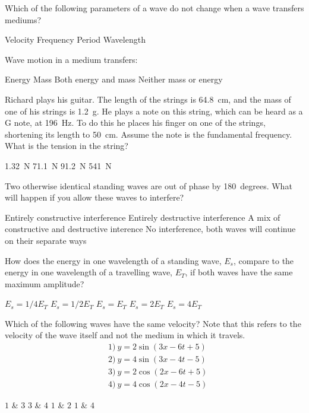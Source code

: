 \question Which of the following parameters of a wave do not change when a wave transfers mediums?
\begin{checkboxes}
\choice Velocity
\CorrectChoice Frequency \correct
\CorrectChoice Period \correct
\choice Wavelength
\end{checkboxes}

\question Wave motion in a medium transfers:
\begin{checkboxes}
\CorrectChoice Energy \correct
\choice Mass
\choice Both energy and mass
\choice Neither mass or energy
\end{checkboxes}


\question Richard plays his guitar.  The length of the strings is \SI{64.8}{cm}, and the mass of one of his strings is \SI{1.2}{g}.  He plays a note on this string, which can be heard as a G note, at \SI{196}{Hz}.  To do this he places his finger on one of the strings, shortening its length to \SI{50}{cm}.  Assume the note is the fundamental frequency. What is the tension in the string?
\begin{checkboxes}
\choice \SI{1.32}{N}
\CorrectChoice \SI{71.1}{N} \correct
\choice  \SI{91.2}{N}
\choice \SI{541}{N}
\end{checkboxes}


\question Two otherwise identical standing waves are out of phase by \SI{180}{degrees}. What will happen if you allow these waves to interfere?
\begin{checkboxes}
\choice Entirely constructive interference
\CorrectChoice Entirely destructive interference \correct
\choice A mix of constructive and destructive interence
\choice No interference, both waves will continue on their separate ways
\end{checkboxes}

\question How does the energy in one wavelength of a standing wave, $E_s$, compare to the energy in one wavelength of a travelling wave, $E_T$, if both waves have the same maximum amplitude?
\begin{checkboxes}
\choice $E_s=1/4 E_T$
\CorrectChoice $E_s=1/2 E_T$
\choice $E_s=E_T$
\choice $E_s=2E_T$
\choice $E_s=4E_T$
\end{checkboxes}


\question Which of the following waves have the same velocity? Note that this refers to the velocity of the wave itself and not the medium in which it travels. 
\begin{align*}
&1)\ y = 2\sin{(3x-6t+5)} \\
&2)\ y = 4\sin{(3x-4t-5)} \\
&3)\ y = 2\cos{(2x-6t+5)} \\
&4)\ y = 4\cos{(2x-4t-5)}
\end{align*}
\begin{checkboxes}
\choice $1$ \& $3$
\choice $3$ \& $4$
\choice $1$ \& $2$ 
\CorrectChoice $1$ \& $4$ \correct
\end{checkboxes}

